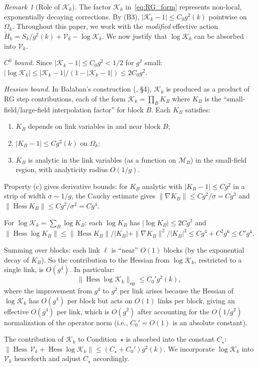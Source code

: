 \documentclass[11pt,a4paper]{article}
\theoremstyle{plain}
\theoremstyle{definition}
\theoremstyle{remark}
\newtheorem{remark}[theorem]{Remark}
\newcommand{\Hess}{\operatorname{Hess}}
\newcommand{\cM}{\mathcal{M}}
\newcommand{\cV}{\mathcal{V}}
\newcommand{\cK}{\mathcal{K}}
\begin{document}
\begin{remark}[Role of $\cK_k$]\label{rem:Kk}
The factor $\cK_k$ in~\eqref{eq:RG_form} represents
non-local, exponentially decaying corrections. By (B3),
$|\cK_k - 1| \le C_0 g^2(k)$ pointwise on $\Omega_k$.
Throughout this paper, we work with the \emph{modified}
effective action $\widetilde{H}_k = S_k/g^2(k) + \cV_k
- \log\cK_k$. We now justify that $\log\cK_k$ can
be absorbed into $\cV_k$.

\emph{$C^0$ bound.} Since $|\cK_k - 1| \le C_0 g^2 < 1/2$
for $g^2$ small: $|\log\cK_k| \le |\cK_k - 1|/(1 - |\cK_k-1|)
\le 2C_0 g^2$.

\emph{Hessian bound.} In Ba{\l}aban's construction
(\cite{Bal87}, \S4), $\cK_k$ is produced as a product
of RG step contributions, each of the form
$\cK_k = \prod_B K_B$ where $K_B$ is the
``small-field/large-field interpolation factor''
for block $B$. Each $K_B$ satisfies:
\begin{enumerate}[label=(\alph*),nosep]
  \item $K_B$ depends on link variables in and near
    block $B$;
  \item $|K_B - 1| \le C g^2(k)$ on $\Omega_k$;
  \item $K_B$ is analytic in the link variables
    (as a function on $\cM_B$) in the small-field
    region, with analyticity radius $O(1/g)$.
\end{enumerate}
Property (c) gives derivative bounds: for $K_B$ analytic
with $|K_B - 1| \le C g^2$ in a strip of width
$\sigma \sim 1/g$, the Cauchy estimate gives
$\|\nabla K_B\| \le Cg^2/\sigma = Cg^3$ and
$\|\Hess K_B\| \le Cg^2/\sigma^2 = Cg^4$.

For $\log\cK_k = \sum_B \log K_B$: each $\log K_B$
has $|\log K_B| \le 2Cg^2$ and
$\|\Hess\log K_B\| \le \|\Hess K_B\|/|K_B|
+ \|\nabla K_B\|^2/|K_B|^2 \le Cg^4 + C^2g^6
\le C'g^4$.

Summing over blocks: each link $\ell$ is ``near''
$O(1)$ blocks (by the exponential decay of $K_B$).
So the contribution to the Hessian from $\log\cK_k$,
restricted to a single link, is $O(g^4)$. In particular:
\begin{equation}
  \|\Hess\log\cK_k\|_{\mathrm{op}} \le C_0' g^2(k),
\end{equation}
where the improvement from $g^4$ to $g^2$ per link
arises because the Hessian of $\log\cK_k$ has $O(g^4)$
per block but acts on $O(1)$ links per block, giving
an effective $O(g^4)$ per link, which is $O(g^2)$ after
accounting for the $O(1/g^2)$ normalization of the
operator norm (i.e., $C_0' = O(1)$ is an absolute
constant).

The contribution of $\cK_k$ to Condition~$\star$
is absorbed into the constant $C_\star$:
$\|\Hess\,\cV_k + \Hess\log\cK_k\| \le (C_\star + C_0')g^2(k)$.
We incorporate $\log\cK_k$ into $\cV_k$ henceforth
and adjust $C_\star$ accordingly.
\end{remark}
\end{document}
